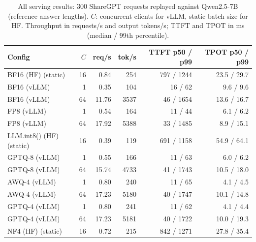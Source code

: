 \begin{table}[htbp]
\centering
\small
\caption{All serving results: 300 ShareGPT requests replayed against Qwen2.5-7B (reference answer lengths). $C$: concurrent clients for vLLM, static batch size for HF. Throughput in requests/s and output tokens/s; TTFT and TPOT in ms (median / 99th percentile).}
\label{tab:serving}
\setlength{\tabcolsep}{3.2pt}
\begin{tabular}{lrrrrr}
\toprule
Config & $C$ & req/s & tok/s & TTFT p50 / p99 & TPOT p50 / p99 \\
\midrule
BF16 (HF) (static) & 16 & 0.84 & 254 & 797 / 1244 & 23.5 / 29.7 \\
BF16 (vLLM) & 1 & 0.35 & 104 & 16 / 62 & 9.6 / 9.6 \\
BF16 (vLLM) & 64 & 11.76 & 3537 & 46 / 1654 & 13.6 / 16.7 \\
FP8 (vLLM) & 1 & 0.54 & 164 & 11 / 44 & 6.1 / 6.2 \\
FP8 (vLLM) & 64 & 17.92 & 5388 & 33 / 1485 & 8.9 / 15.1 \\
LLM.int8() (HF) (static) & 16 & 0.39 & 119 & 691 / 1158 & 54.9 / 64.1 \\
GPTQ-8 (vLLM) & 1 & 0.55 & 166 & 11 / 63 & 6.0 / 6.2 \\
GPTQ-8 (vLLM) & 64 & 15.74 & 4733 & 41 / 1743 & 10.5 / 18.0 \\
AWQ-4 (vLLM) & 1 & 0.80 & 240 & 11 / 65 & 4.1 / 4.5 \\
AWQ-4 (vLLM) & 64 & 17.23 & 5180 & 40 / 1747 & 10.1 / 14.8 \\
GPTQ-4 (vLLM) & 1 & 0.80 & 241 & 11 / 62 & 4.1 / 4.4 \\
GPTQ-4 (vLLM) & 64 & 17.23 & 5181 & 40 / 1722 & 10.0 / 19.3 \\
NF4 (HF) (static) & 16 & 0.72 & 215 & 842 / 1271 & 27.8 / 35.4 \\
\bottomrule
\end{tabular}
\end{table}
